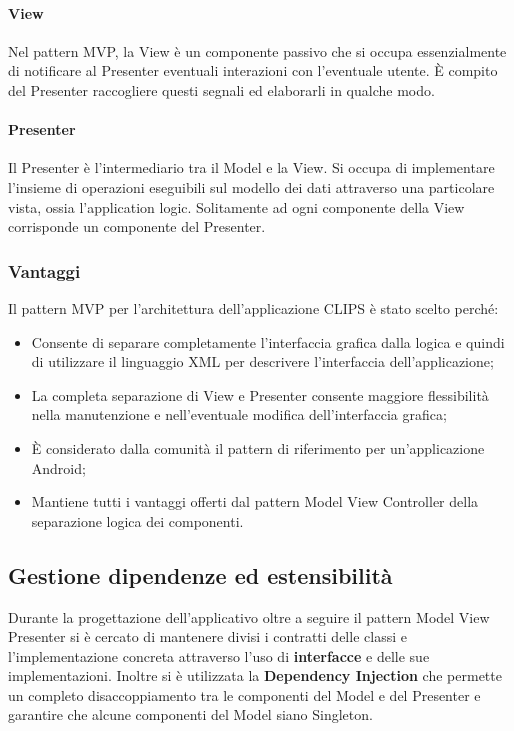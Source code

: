 \documentclass[../ManualeSviluppatore.tex]{subfiles}
\begin{document}
				\paragraph*{View}
					Nel pattern MVP, la View è un componente passivo che si occupa essenzialmente di notificare al Presenter eventuali interazioni con l'eventuale utente. È compito del Presenter raccogliere questi segnali ed elaborarli in qualche modo.
					
				\paragraph*{Presenter}
					Il Presenter è l'intermediario tra il Model e la View. Si occupa di implementare l'insieme di operazioni eseguibili sul modello dei dati attraverso una particolare vista, ossia l'application logic. Solitamente ad ogni componente della View corrisponde un componente del Presenter.
					
			\subsubsection{Vantaggi}
				Il pattern MVP per l'architettura dell'applicazione CLIPS è stato scelto perché:
				\begin{itemize}
					\item Consente di separare completamente l'interfaccia grafica dalla logica e quindi di utilizzare il linguaggio XML per descrivere l'interfaccia dell'applicazione;
					\item La completa separazione di View e Presenter consente maggiore flessibilità nella manutenzione e nell'eventuale modifica dell'interfaccia grafica;
					\item È considerato dalla comunità il pattern di riferimento per un'applicazione \gls{Android};
					\item Mantiene tutti i vantaggi offerti dal pattern Model View Controller della separazione logica dei componenti.
				\end{itemize}
	
	
	\subsection{Gestione dipendenze ed estensibilità}
		Durante la progettazione dell'applicativo oltre a seguire il pattern Model View Presenter si è cercato di mantenere divisi i contratti delle classi e l'implementazione concreta attraverso l'uso di \textbf{interfacce} e delle sue implementazioni.
		Inoltre si è utilizzata la \textbf{Dependency Injection} che permette un completo disaccoppiamento tra le componenti del Model e del Presenter e garantire che alcune componenti del Model siano Singleton.
		
\end{document}
